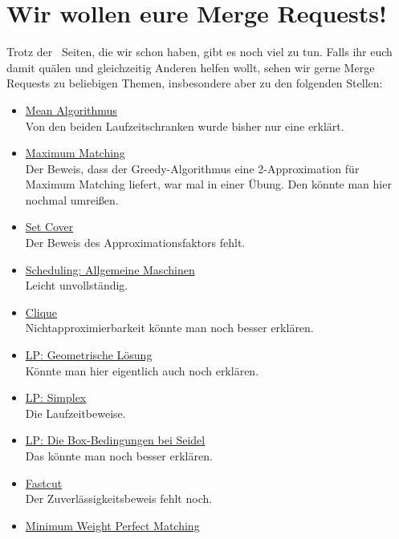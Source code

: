 \documentclass{panikzettel}
\begin{document}
\newpage
\sffamily
\section{Wir wollen eure Merge Requests!}
\label{sec:merge-requests}
Trotz der~\pageref*{ende} Seiten, die wir schon haben, gibt es noch viel zu tun. Falls ihr euch damit quälen und gleichzeitig Anderen helfen wollt, sehen wir gerne Merge Requests zu beliebigen Themen, insbesondere aber zu den folgenden Stellen:
\begin{itemize}
    \item\label{mrExp:mean-algo} \hyperlink{mr:mean-algo}{Mean Algorithmus}   \\
    Von den beiden Laufzeitschranken wurde bisher nur eine erklärt.
    \item\label{mrExp:maximum-matching}\hyperlink{mr:maximum-matching}{Maximum Matching}  \\
    Der Beweis, dass der Greedy-Algorithmus eine 2-Approximation für Maximum Matching liefert, war mal in einer Übung. Den könnte man hier nochmal umreißen.
    \item\label{mrExp:set-cover}\hyperlink{mr:set-cover}{Set Cover}   \\
    Der Beweis des Approximationsfaktors fehlt.
    \item\label{mrExp:allgemeine-maschinen}\hyperlink{mr:allgemeine-maschinen}{Scheduling: Allgemeine Maschinen}  \\
    Leicht unvollständig.
    \item\label{mrExp:clique}\hyperlink{mr:clique}{Clique}    \\
    Nichtapproximierbarkeit könnte man noch besser erklären.
    \item\label{mrExp:lp-geo}\hyperlink{mr:lp-geo}{LP: Geometrische Lösung}    \\
    Könnte man hier eigentlich auch noch erklären.
    \item\label{mrExp:lp-simplex}\hyperlink{mr:lp-simplex}{LP: Simplex}   \\
    Die Laufzeitbeweise.
    \item\label{mrExp:lp-seidel-box}\hyperlink{mr:lp-seidel-box}{LP: Die Box-Bedingungen bei Seidel}  \\
    Das könnte man noch besser erklären.
    \item\label{mrExp:fastcut}\hyperlink{mr:fastcut}{Fastcut} \\
    Der Zuverlässigkeitsbeweis fehlt noch.
    \item\label{mrExp:min-weight-perfect-matching}\hyperlink{mr:min-weight-perfect-matching}{Minimum Weight Perfect Matching}    \\

\end{itemize}
\end{document}
